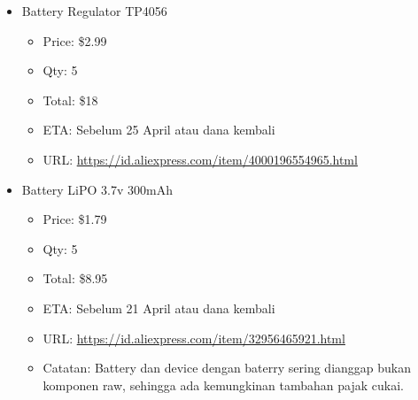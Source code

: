 \documentclass[12pt,]{article}
\begin{document}
\begin{itemize}
		\item Battery Regulator TP4056
		\begin{itemize}
			\item Price: \$2.99
			\item Qty: 5
			\item Total: \$18
			\item ETA: Sebelum 25 April atau dana kembali 
			\item URL: \url{https://id.aliexpress.com/item/4000196554965.html}
		\end{itemize}
	
		\item Battery LiPO 3.7v 300mAh
		\begin{itemize}
			\item Price: \$1.79
			\item Qty: 5
			\item Total: \$8.95
			\item ETA: Sebelum 21 April atau dana kembali 
			\item URL: \url{https://id.aliexpress.com/item/32956465921.html}
			\item Catatan: Battery dan device dengan baterry sering dianggap bukan komponen raw,
			sehingga ada kemungkinan tambahan pajak cukai.
		\end{itemize}
	
	\end{itemize}
		
\end{document}
